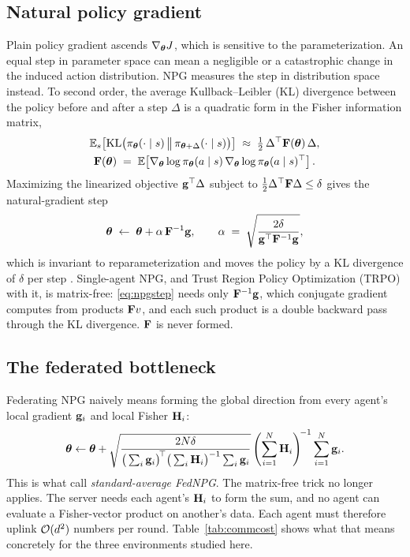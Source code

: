 \subsection{Natural policy gradient}

Plain policy gradient ascends $\nabla_{\boldsymbol{\theta}} J$, which is sensitive to the
parameterization. An equal step in parameter space can mean a negligible or a
catastrophic change in the induced action distribution. NPG measures the step
in distribution space instead. To second order, the average Kullback--Leibler
(KL) divergence between the policy before and after a step $\Delta$ is a
quadratic form in the Fisher information matrix,
\begin{gather}
  \mathbb{E}_s\!\left[\mathrm{KL}\big(\pi_{\boldsymbol{\theta}}(\cdot\mid s)\,\big\|\,
                      \pi_{\boldsymbol{\theta}+\Delta}(\cdot\mid s)\big)\right]
  \;\approx\; \tfrac12\,\Delta^{\top}\mathbf{F}(\boldsymbol{\theta})\,\Delta,
  \label{eq:klquad}\\
  \mathbf{F}(\boldsymbol{\theta}) \;=\;
  \mathbb{E}\!\left[\nabla_{\boldsymbol{\theta}} \log \pi_{\boldsymbol{\theta}}(a\mid s)\,
              \nabla_{\boldsymbol{\theta}} \log \pi_{\boldsymbol{\theta}}(a\mid s)^{\top}\right].
  \nonumber
\end{gather}
Maximizing the linearized objective $\mathbf{g}^{\top}\Delta$ subject to
$\tfrac12\Delta^{\top}\mathbf{F}\Delta \le \delta$ gives the natural-gradient step
\begin{equation}
  \boldsymbol{\theta} \;\leftarrow\; \boldsymbol{\theta} + \alpha\, \mathbf{F}^{-1}\mathbf{g},
  \qquad
  \alpha \;=\; \sqrt{\frac{2\delta}{\mathbf{g}^{\top} \mathbf{F}^{-1} \mathbf{g}}} ,
  \label{eq:npgstep}
\end{equation}
which is invariant to reparameterization and moves the policy by a KL
divergence of $\delta$ per step \citep{kakade2001npg, schulman2015trpo}.
Single-agent NPG, and Trust Region Policy Optimization (TRPO) with it, is
matrix-free: \eqref{eq:npgstep} needs only $\mathbf{F}^{-1}\mathbf{g}$, which conjugate
gradient computes from products $\mathbf{F} v$, and each such product is a double
backward pass through the KL divergence. $\mathbf{F}$ is never formed.

\subsection{The federated bottleneck}

Federating NPG naively means forming the global direction from every agent's
local gradient $\mathbf{g}_i$ and local Fisher $\mathbf{H}_i$:
\begin{equation}
  \boldsymbol{\theta} \leftarrow \boldsymbol{\theta} +
  \sqrt{\frac{2N\delta}
             {\big(\sum_{i} \mathbf{g}_i\big)^{\!\top}
              \big(\sum_{i} \mathbf{H}_i\big)^{-1} \sum_{i} \mathbf{g}_i}}
  \left(\sum_{i=1}^{N} \mathbf{H}_i\right)^{\!-1} \sum_{i=1}^{N} \mathbf{g}_i .
  \label{eq:stdfednpg}
\end{equation}
This is what \citet{lan2023fednpgadmm} call \emph{standard-average FedNPG}.
The matrix-free trick no longer applies. The server needs each agent's $\mathbf{H}_i$
to form the sum, and no agent can evaluate a Fisher-vector product on
another's data. Each agent must therefore uplink $\mathcal{O}(d^2)$ numbers per round.
Table~\ref{tab:commcost} shows what that means concretely for the three
environments studied here.

